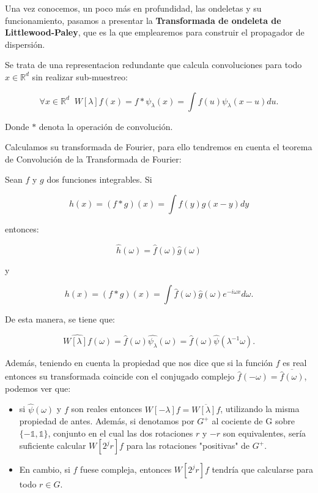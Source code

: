 \noindent Una vez conocemos, un poco más en profundidad, las ondeletas y su funcionamiento, pasamos a presentar la \textbf{Transformada de ondeleta de Littlewood-Paley}, que es la que emplearemos para construir el propagador de dispersión.

\medskip

\noindent Se trata de una representacion redundante que calcula convoluciones para todo $x \in \mathbb{R}^d$ sin realizar sub-muestreo: 

\begin{equation}
  \forall x \in  \mathbb{R}^d \;\; W[\lambda]f(x)= f \ast \psi_\lambda(x)=\int f(u)\psi_\lambda(x-u) du .
\end{equation}

\noindent Donde $\ast$ denota la operación de convolución. 

\medskip

\noindent Calculamos su transformada de Fourier, para ello tendremos en cuenta el teorema de Convolución de la Transformada de Fourier: 

\begin{teorema} \label{Teorema::Convolucion}
 Sean $f$ y $g$ dos funciones integrables. Si 

 $$h(x)=(f\ast g)(x)=\int f(y)g(x-y) dy$$

 entonces: 

 $$\widehat{h}(\omega)=\widehat{f}(\omega) \widehat{g}(\omega)$$

 y 

 $$h(x)=(f \ast g)(x)= \int \widehat{f}(\omega) \widehat{g}(\omega) e^{-i\omega x} d\omega.$$
 
\end{teorema}

De esta manera, se tiene que: 

$$\widehat{W[\lambda]f}(\omega)=\widehat{f}(\omega)\widehat{\psi_\lambda}(\omega)=\widehat{f}(\omega)\widehat{\psi}(\lambda^{-1}\omega).$$

\noindent Además, teniendo en cuenta la propiedad que nos dice que si la función $f$ es real entonces su transformada coincide con el conjugado complejo $\widehat{f}(-\omega)=\overline{\widehat{f}(\omega)}$, podemos ver que: 

\begin{itemize}
  \item si $\widehat{\psi}(\omega)$ y $f$ son reales entonces $W[-\lambda]f= \overline{W[\lambda]f}$, utilizando la misma propiedad de antes. Además, si denotamos por $G^{+}$ al cociente de G sobre $\lbrace-\mathbb{1},\mathbb{1}\rbrace$, conjunto en el cual las dos rotaciones $r$ y $-r$ son equivalentes, sería suficiente calcular $W[2^jr]f$ para las rotaciones "positivas" de $G^{+}$.
  \item En cambio, si $f$ fuese compleja, entonces $W[2^jr]f$ tendría que calcularse para todo $r \in G$.
\end{itemize}

